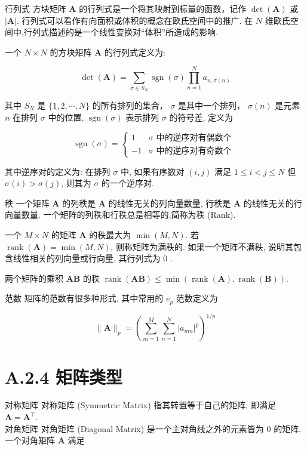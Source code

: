 \documentclass[10pt]{article}
\begin{document}
行列式 方块矩阵 $\boldsymbol{A}$ 的行列式是一个将其映射到标量的函数，记作 $\operatorname{det}(\boldsymbol{A})$ 或 $|\boldsymbol{A}|$. 行列式可以看作有向面积或体积的概念在欧氏空间中的推广. 在 $N$ 维欧氏空间中,行列式描述的是一个线性变换对“体积”所造成的影响.

一个 $N \times N$ 的方块矩阵 $\boldsymbol{A}$ 的行列式定义为:


\begin{equation*}
\operatorname{det}(\boldsymbol{A})=\sum_{\sigma \in S_{N}} \operatorname{sgn}(\sigma) \prod_{n=1}^{N} a_{n, \sigma(n)} \tag{A.29}
\end{equation*}


其中 $S_{N}$ 是 $\{1,2, \cdots, N\}$ 的所有排列的集合， $\sigma$ 是其中一个排列， $\sigma(n)$ 是元素 $n$ 在排列 $\sigma$ 中的位置, $\operatorname{sgn}(\sigma)$ 表示排列 $\sigma$ 的符号差, 定义为

\[
\operatorname{sgn}(\sigma)=\left\{\begin{array}{cl}
1 & \sigma \text { 中的逆序对有偶数个 }  \tag{A.30}\\
-1 & \sigma \text { 中的逆序对有奇数个 }
\end{array}\right.
\]

其中逆序对的定义为: 在排列 $\sigma$ 中, 如果有序数对 $(i, j)$ 满足 $1 \leq i<j \leq N$ 但 $\sigma(i)>\sigma(j)$, 则其为 $\sigma$ 的一个逆序对.

秩 一个矩阵 $\boldsymbol{A}$ 的列秩是 $\boldsymbol{A}$ 的线性无关的列向量数量, 行秩是 $\boldsymbol{A}$ 的线性无关的行向量数量. 一个矩阵的列秩和行秩总是相等的,简称为秩 (Rank).

一个 $M \times N$ 的矩阵 $\boldsymbol{A}$ 的秩最大为 $\min (M, N)$. 若 $\operatorname{rank}(\boldsymbol{A})=\min (M, N)$, 则称矩阵为满秩的. 如果一个矩阵不满秩, 说明其包含线性相关的列向量或行向量, 其行列式为 0 .

两个矩阵的乘积 $\boldsymbol{A B}$ 的秩 $\operatorname{rank}(\boldsymbol{A B}) \leq \min (\operatorname{rank}(\boldsymbol{A}), \operatorname{rank}(\boldsymbol{B}))$.

范数 矩阵的范数有很多种形式, 其中常用的 $e_{p}$ 范数定义为


\begin{equation*}
\|\boldsymbol{A}\|_{p}=\left(\sum_{m=1}^{M} \sum_{n=1}^{N}\left|a_{m n}\right|^{p}\right)^{1 / p} \tag{A.31}
\end{equation*}


\section*{A.2.4 矩阵类型}
对称矩阵 对称矩阵 (Symmetric Matrix) 指其转置等于自己的矩阵, 即满足 $\boldsymbol{A}=\boldsymbol{A}^{\top}$.\\
对角矩阵 对角矩阵 (Diagonal Matrix) 是一个主对角线之外的元素皆为 0 的矩阵. 一个对角矩阵 $\boldsymbol{A}$ 满足
\end{document}
